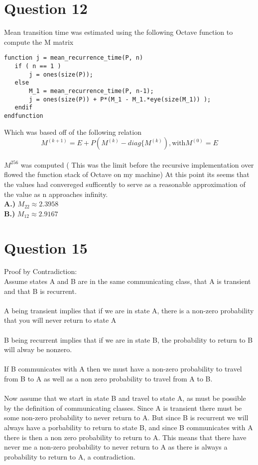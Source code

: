\documentclass{article}
\begin{document}
\section*{Question 12}
Mean transition time was estimated using the following Octave function to
compute the M matrix
\begin{lstlisting}[frame=single] 
function j = mean_recurrence_time(P, n)
   if ( n == 1 ) 
       j = ones(size(P));
   else 
       M_1 = mean_recurrence_time(P, n-1);
       j = ones(size(P)) + P*(M_1 - M_1.*eye(size(M_1)) );
   endif
endfunction
\end{lstlisting}
Which was based off of the following relation 
\[ M^{(k+1)} = E + P(M^{(k)} - diag\{M^{(k)}), \mbox{with} M^{(0)} = E	\]
\\\(M^{256}\) was computed ( This was the limit before the recursive
implementation over flowed the function stack of Octave on my machine) At this
point its seems that the values had convereged sufficently to serve as a
reasonable approximation of the value as n approaches infinity. 
 \\\textbf{A.)} \(M_{22} \approx 2.3958\) 
 \\\textbf{B.)} \(M_{12} \approx 2.9167\)

\section*{Question 15}
Proof by Contradiction:
\\Assume states A and B are in the same communicating class,
that A is transient and that B is recurrent. 
\\
\\A being transient implies that if we are in state A, there is a non-zero
probability that you will never return to state A
\\
\\B being recurrent implies that if we are in state B, the probability to return
to B will alway be nonzero. 
\\
\\If B communicates with A then we must have a non-zero probability to travel
from B to A as well as a non zero probability to travel from A to B.
\\
\\Now assume that we start in state B and travel to state A, as must be possible
by the definition of communicating classes. Since A is transient there must be
some non-zero probability to never return to A. But since B is recurrent we will
always have a porbability to return to state B, and since B communicates with A
there is then a non zero probability to return to A. This means that there have
never me a non-zero probability to never return to A as there is always a
probability to return to A, a contradiction. 
\end{document}
